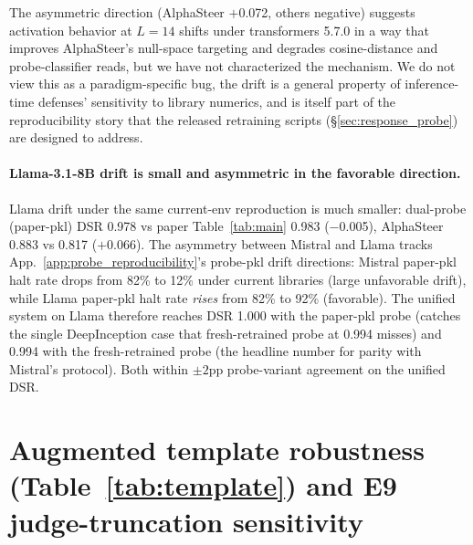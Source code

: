 \documentclass{article}
\begin{document}
The asymmetric direction (AlphaSteer $+$0.072, others negative) suggests activation behavior at $L=14$ shifts under transformers 5.7.0 in a way that improves AlphaSteer's null-space targeting and degrades cosine-distance and probe-classifier reads, but we have not characterized the mechanism. We do not view this as a paradigm-specific bug, the drift is a general property of inference-time defenses' sensitivity to library numerics, and is itself part of the reproducibility story that the released retraining scripts (\S\ref{sec:response_probe}) are designed to address.

\paragraph{Llama-3.1-8B drift is small and asymmetric in the favorable direction.}
Llama drift under the same current-env reproduction is much smaller: dual-probe (paper-pkl) DSR 0.978 vs paper Table~\ref{tab:main} 0.983 ($-$0.005), AlphaSteer 0.883 vs 0.817 ($+$0.066). The asymmetry between Mistral and Llama tracks App.~\ref{app:probe_reproducibility}'s probe-pkl drift directions: Mistral paper-pkl halt rate drops from 82\% to 12\% under current libraries (large unfavorable drift), while Llama paper-pkl halt rate \emph{rises} from 82\% to 92\% (favorable). The unified system on Llama therefore reaches DSR 1.000 with the paper-pkl probe (catches the single DeepInception case that fresh-retrained probe at 0.994 misses) and 0.994 with the fresh-retrained probe (the headline number for parity with Mistral's protocol). Both within $\pm 2$pp probe-variant agreement on the unified DSR.

\section{Augmented template robustness (Table~\ref{tab:template}) and E9 judge-truncation sensitivity}
\label{app:e9_table3}
\end{document}
